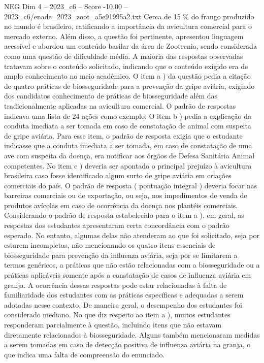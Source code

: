 \begin{textsample}{NEG Dim 4 – 2023\_c6 – Score -10.00 – 2023\_c6/enade\_2023\_zoot\_a5e91995a2.txt}
Cerca de 15 \% do frango produzido no mundo é brasileiro, ratificando a importância da avicultura comercial para o mercado externo.
Além disso, a questão foi pertinente, apresentou linguagem acessível e abordou um conteúdo basilar da área de Zootecnia, sendo considerada como uma questão de dificuldade média.
A maioria das respostas observadas tratavam sobre o conteúdo solicitado, indicando que o conteúdo exigido era de amplo conhecimento no meio acadêmico.
O item a ) da questão pedia a citação de quatro práticas de biosseguridade para a prevenção da gripe aviária, exigindo dos candidatos conhecimento de práticas de biosseguridade além das tradicionalmente aplicadas na avicultura comercial.
O padrão de respostas indicava uma lista de 24 ações como exemplo.
O item b ) pedia a explicação da conduta imediata a ser tomada em caso de constatação de animal com suspeita de gripe aviária.
Para esse item, o padrão de resposta exigia que o estudante indicasse que a conduta imediata a ser tomada, em caso de constatação de uma ave com suspeita da doença, era notificar aos órgãos de Defesa Sanitária Animal competentes.
No item c ) deveria ser apontado o principal prejuízo à avicultura brasileira caso fosse identificado algum surto de gripe aviária em criações comerciais do país.
O padrão de resposta ( pontuação integral ) deveria focar nas barreiras comerciais ou de exportação, ou seja, nos impedimentos de venda de produtos avícolas em caso de ocorrência da doença nos plantéis comerciais.
Considerando o padrão de resposta estabelecido para o item a ), em geral, as respostas dos estudantes apresentaram certa concordância com o padrão esperado.
No entanto, algumas delas não atenderam ao que foi solicitado, seja por estarem incompletas, não mencionando os quatro itens essenciais de biosseguridade para prevenção da influenza aviária, seja por se limitarem a termos genéricos, a práticas que não estão relacionadas com a biosseguridade ou a práticas aplicáveis somente após a constatação de casos de influenza aviária em granja.
A ocorrência dessas respostas pode estar relacionadas à falta de familiaridade dos estudantes com as práticas específicas e adequadas a serem adotadas nesse contexto.
De maneira geral, o desempenho dos estudantes foi considerado mediano.
No que diz respeito ao item a ), muitos estudantes responderam parcialmente à questão, incluindo itens que não estavam diretamente relacionados à biosseguridade.
Alguns também mencionaram medidas a serem tomadas em caso de detecção positiva de influenza aviária na granja, o que indica uma falta de compreensão do enunciado.

\end{textsample}
